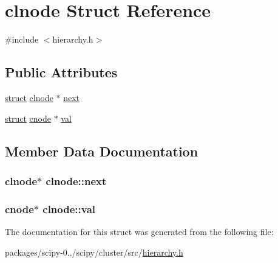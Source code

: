 \hypertarget{structclnode}{}\section{clnode Struct Reference}
\label{structclnode}


{\ttfamily \#include $<$hierarchy.\+h$>$}

\subsection*{Public Attributes}
\begin{DoxyCompactItemize}
\item 
\hyperlink{gen__mat5files_8m_aa5a86657308844fba3fe81ef5286ca5f}{struct} \hyperlink{structclnode}{clnode} $\ast$ \hyperlink{structclnode_a77e39f97d80d9c88064d0fd1a9eaf9a6}{next}
\item 
\hyperlink{gen__mat5files_8m_aa5a86657308844fba3fe81ef5286ca5f}{struct} \hyperlink{structcnode}{cnode} $\ast$ \hyperlink{structclnode_a54da8d71cd45669365dbed18402e3e11}{val}
\end{DoxyCompactItemize}


\subsection{Member Data Documentation}
\hypertarget{structclnode_a77e39f97d80d9c88064d0fd1a9eaf9a6}{}
\subsubsection[{next}]{ {\bf clnode}$\ast$ clnode\+::next}\label{structclnode_a77e39f97d80d9c88064d0fd1a9eaf9a6}
\hypertarget{structclnode_a54da8d71cd45669365dbed18402e3e11}{}
\subsubsection[{val}]{ {\bf cnode}$\ast$ clnode\+::val}\label{structclnode_a54da8d71cd45669365dbed18402e3e11}


The documentation for this struct was generated from the following file\+:\begin{DoxyCompactItemize}
\item 
packages/scipy-\/0../scipy/cluster/src/\hyperlink{hierarchy_8h}{hierarchy.\+h}\end{DoxyCompactItemize}
